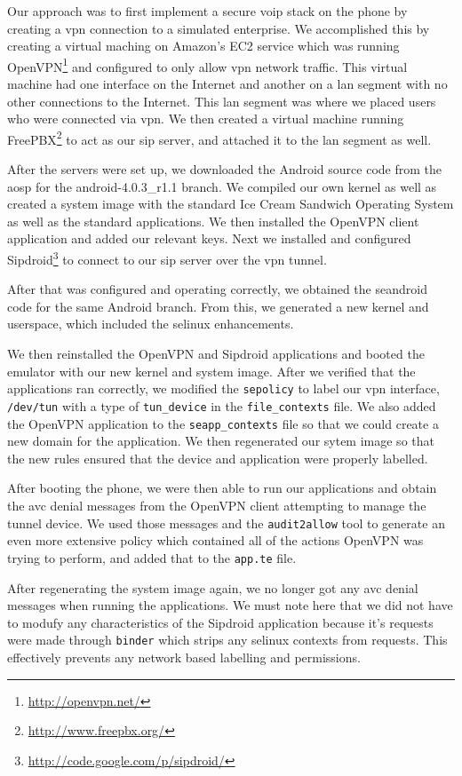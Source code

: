 Our approach was to first implement a secure \ac{voip} stack on the phone by creating a \ac{vpn} connection to a simulated enterprise.
We accomplished this by creating a virtual maching on Amazon's EC2 service which was running OpenVPN\footnote{\url{http://openvpn.net/}} and configured to only allow \ac{vpn} network traffic.
This virtual machine had one interface on the Internet and another on a \ac{lan} segment with no other connections to the Internet.
This \ac{lan} segment was where we placed users who were connected via \ac{vpn}.
We then created a virtual machine running FreePBX\footnote{\url{http://www.freepbx.org/}} to act as our \ac{sip} server, and attached it to the \ac{lan} segment as well.

After the servers were set up, we downloaded the Android source code from the \ac{aosp} for the android-4.0.3\_r1.1 branch.
We compiled our own kernel as well as created a system image with the standard Ice Cream Sandwich Operating System as well as the standard applications.
We then installed the OpenVPN client application and added our relevant keys.
Next we installed and configured Sipdroid\footnote{\url{http://code.google.com/p/sipdroid/}} to connect to our \ac{sip} server over the \ac{vpn} tunnel.

After that was configured and operating correctly, we obtained the \ac{seandroid} code for the same Android branch.
From this, we generated a new kernel and userspace, which included the \ac{selinux} enhancements.

We then reinstalled the OpenVPN and Sipdroid applications and booted the emulator with our new kernel and system image.
After we verified that the applications ran correctly, we modified the \verb=sepolicy= to label our \ac{vpn} interface, \verb=/dev/tun= with a type of \verb=tun_device= in the \verb=file_contexts= file.
We also added the OpenVPN application to the \verb=seapp_contexts= file so that we could create a new domain for the application.
We then regenerated our sytem image so that the new rules ensured that the device and application were properly labelled.

After booting the phone, we were then able to run our applications and obtain the \ac{avc} denial messages from the OpenVPN client attempting to manage the tunnel device.
We used those messages and the \verb=audit2allow= tool to generate an even more extensive policy which contained all of the actions OpenVPN was trying to perform, and added that to the \verb=app.te= file.

After regenerating the system image again, we no longer got any \ac{avc} denial messages when running the applications.
We must note here that we did not have to modufy any characteristics of the Sipdroid application because it's requests were made through \verb=binder= which strips any \ac{selinux} contexts from requests.
This effectively prevents any network based labelling and permissions.
